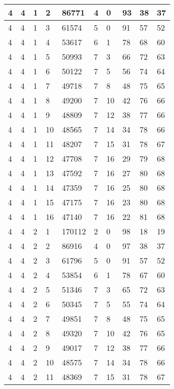 \begin{table}[!ht]
\begin{tabular}{|l|l|l|l|l|l|l|l|l|l|}
        4 & 4 & 1 & 2 & 86771 & 4 & 0 & 93 & 38 & 37 \\ \hline
        4 & 4 & 1 & 3 & 61574 & 5 & 0 & 91 & 57 & 52 \\ \hline
        4 & 4 & 1 & 4 & 53617 & 6 & 1 & 78 & 68 & 60 \\ \hline
        4 & 4 & 1 & 5 & 50993 & 7 & 3 & 66 & 72 & 63 \\ \hline
        4 & 4 & 1 & 6 & 50122 & 7 & 5 & 56 & 74 & 64 \\ \hline
        4 & 4 & 1 & 7 & 49718 & 7 & 8 & 48 & 75 & 65 \\ \hline
        4 & 4 & 1 & 8 & 49200 & 7 & 10 & 42 & 76 & 66 \\ \hline
        4 & 4 & 1 & 9 & 48809 & 7 & 12 & 38 & 77 & 66 \\ \hline
        4 & 4 & 1 & 10 & 48565 & 7 & 14 & 34 & 78 & 66 \\ \hline
        4 & 4 & 1 & 11 & 48207 & 7 & 15 & 31 & 78 & 67 \\ \hline
        4 & 4 & 1 & 12 & 47708 & 7 & 16 & 29 & 79 & 68 \\ \hline
        4 & 4 & 1 & 13 & 47592 & 7 & 16 & 27 & 80 & 68 \\ \hline
        4 & 4 & 1 & 14 & 47359 & 7 & 16 & 25 & 80 & 68 \\ \hline
        4 & 4 & 1 & 15 & 47175 & 7 & 16 & 23 & 80 & 68 \\ \hline
        4 & 4 & 1 & 16 & 47140 & 7 & 16 & 22 & 81 & 68 \\ \hline
        4 & 4 & 2 & 1 & 170112 & 2 & 0 & 98 & 18 & 19 \\ \hline
        4 & 4 & 2 & 2 & 86916 & 4 & 0 & 97 & 38 & 37 \\ \hline
        4 & 4 & 2 & 3 & 61796 & 5 & 0 & 91 & 57 & 52 \\ \hline
        4 & 4 & 2 & 4 & 53854 & 6 & 1 & 78 & 67 & 60 \\ \hline
        4 & 4 & 2 & 5 & 51346 & 7 & 3 & 65 & 72 & 63 \\ \hline
        4 & 4 & 2 & 6 & 50345 & 7 & 5 & 55 & 74 & 64 \\ \hline
        4 & 4 & 2 & 7 & 49851 & 7 & 8 & 48 & 75 & 65 \\ \hline
        4 & 4 & 2 & 8 & 49320 & 7 & 10 & 42 & 76 & 65 \\ \hline
        4 & 4 & 2 & 9 & 49017 & 7 & 12 & 38 & 77 & 66 \\ \hline
        4 & 4 & 2 & 10 & 48575 & 7 & 14 & 34 & 78 & 66 \\ \hline
        4 & 4 & 2 & 11 & 48369 & 7 & 15 & 31 & 78 & 67 \\ \hline

\end{tabular}
\end{table}
